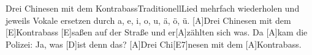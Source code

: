 \documentclass[../main.tex]{subfiles}
\begin{document}
\begin{song}{Drei Chinesen mit dem Kontrabass}{Traditionell}{Lied mehrfach wiederholen und jeweils Vokale ersetzen durch a, e, i, o, u, ä, ö, ü.}
[A]Drei Chinesen mit dem [E]Kontrabass
[E]saßen auf der Straße und er[A]zählten sich was.
Da [A]kam die Polizei: Ja, was [D]ist denn das?
[A]Drei Chi[E7]nesen mit dem [A]Kontrabass.
\end{song}
\end{document}
